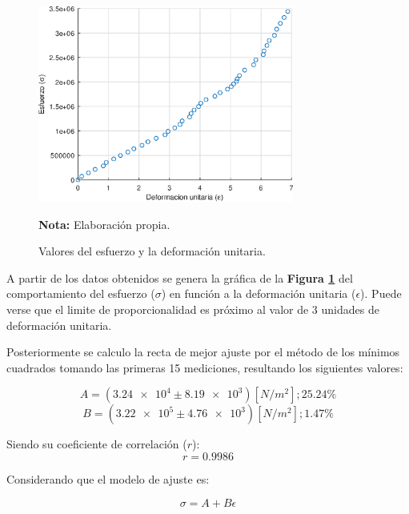 \documentclass[letter,11pt]{article}
\newcommand{\source}[1]{\vspace{-11pt} \caption*{\small{\textbf{Nota:} {#1}}}}
\begin{document}
\begin{figure}
\centering
\includegraphics[width=0.75\textwidth]{resources/o1.eps}
\caption{Valores del esfuerzo y la deformación unitaria.}
\label{figura4}
\source{Elaboración propia.}
\end{figure}

A partir de los datos obtenidos se genera la gráfica de la
\textbf{Figura \ref{figura4}} del comportamiento del esfuerzo ($\sigma$) en
función a la deformación unitaria ($\epsilon$). Puede verse que el limite de
proporcionalidad es próximo al valor de 3 unidades de deformación unitaria.

Posteriormente se calculo la recta de mejor ajuste por el método de los mínimos
cuadrados tomando las primeras 15 mediciones, resultando los siguientes valores:

\begin{equation*}
    A = (\num{3.24e4} \pm \num{8.19e3}) [N/m^2]; 25.24\%
\end{equation*}
\begin{equation*}
    B = (\num{3.22e5} \pm \num{4.76e3}) [N/m^2]; 1.47\%
\end{equation*}
\vspace{0.10cm}

Siendo su coeficiente de correlación ($r$):
\begin{equation*}
    r = 0.9986
\end{equation*}
\vspace{0.10cm}

Considerando que el modelo de ajuste es:

\begin{equation*}
    \sigma = A + B \epsilon
\end{equation*}
\vspace{0.10cm}
\end{document}
